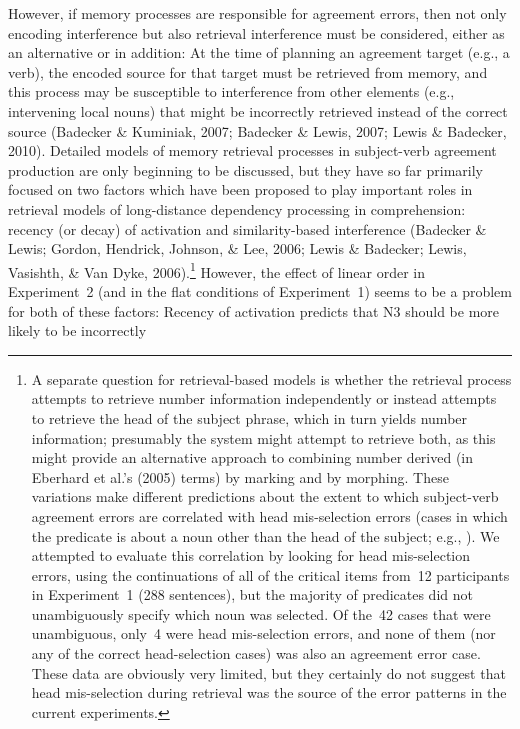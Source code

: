 \documentclass[12pt,titlepage]{article}
\begin{document}
However, if memory processes are responsible for agreement errors, then not
only encoding interference but also retrieval interference must be
considered, either as an alternative or in addition: At the time of
planning an agreement target (e.g., a verb), the encoded source for that
target must be retrieved from memory, and this process may be susceptible
to interference from other elements (e.g., intervening local nouns) that
might be incorrectly retrieved instead of the correct source (Badecker \&
Kuminiak, 2007; Badecker \& Lewis, 2007; Lewis \& Badecker, 2010).
Detailed models of memory retrieval processes in subject-verb agreement
production are only beginning to be discussed, but they have so far
primarily focused on two factors which have been proposed to play important
roles in retrieval models of long-distance dependency processing in
comprehension: recency (or decay) of activation and similarity-based
interference (Badecker \& Lewis; Gordon, Hendrick, Johnson, \& Lee, 2006;
Lewis \& Badecker; Lewis, Vasishth, \& Van Dyke, 2006).\footnote{A separate
question for retrieval-based models is whether the retrieval process
attempts to retrieve number information independently or instead attempts
to retrieve the head of the subject phrase, which in turn yields number
information; presumably the system might attempt to retrieve both, as this
might provide an alternative approach to combining number derived (in
Eberhard et al.'s (2005) terms) by marking and by morphing.  These
variations make different predictions about the extent to which
subject-verb agreement errors are correlated with head mis-selection errors
(cases in which the predicate is about a noun other than the head of the
subject; e.g., ).
We attempted to evaluate this correlation by looking for head mis-selection
errors, using the continuations of all of the critical items from~12
participants in Experiment~1 (288 sentences), but the majority of
predicates did not unambiguously specify which noun was selected.  Of
the~42 cases that were unambiguous, only~4 were head mis-selection errors,
and none of them (nor any of the correct head-selection cases) was also an
agreement error case.  These data are obviously very limited, but they
certainly do not suggest that head mis-selection during retrieval was the
source of the error patterns in the current experiments.} However, the
effect of linear order in Experiment~2 (and in the flat conditions of
Experiment~1) seems to be a problem for both of these factors: Recency of
activation predicts that N3 should be more likely to be incorrectly
\end{document}
